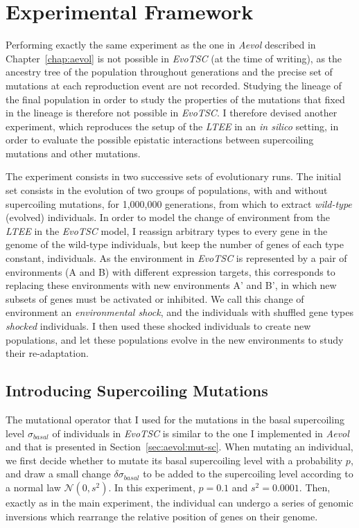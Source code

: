 \section{Experimental Framework}

Performing exactly the same experiment as the one in \emph{Aevol} described in Chapter~\ref{chap:aevol} is not possible in \emph{EvoTSC} (at the time of writing), as the ancestry tree of the population throughout generations and the precise set of mutations at each reproduction event are not recorded.
Studying the lineage of the final population in order to study the properties of the mutations that fixed in the lineage is therefore not possible in \emph{EvoTSC}.
I therefore devised another experiment, which reproduces the setup of the \emph{LTEE} in an \emph{in silico} setting, in order to evaluate the possible epistatic interactions between supercoiling mutations and other mutations.

The experiment consists in two successive sets of evolutionary runs.
The initial set consists in the evolution of two groups of populations, with and without supercoiling mutations, for 1,000,000 generations, from which to extract \emph{wild-type} (evolved) individuals.
In order to model the change of environment from the \emph{LTEE} in the \emph{EvoTSC} model, I reassign arbitrary types to every gene in the genome of the wild-type individuals, but keep the number of genes of each type constant, individuals.
As the environment in \emph{EvoTSC} is represented by a pair of environments (A and B) with different expression targets, this corresponds to replacing these environments with new environments A' and B', in which new subsets of genes must be activated or inhibited.
We call this change of environment an \emph{environmental shock}, and the individuals with shuffled gene types \emph{shocked} individuals.
I then used these shocked individuals to create new populations, and let these populations evolve in the new environments to study their re-adaptation.

\subsection{Introducing Supercoiling Mutations}

The mutational operator that I used for the mutations in the basal supercoiling level $\sigma_{basal}$ of individuals in \emph{EvoTSC} is similar to the one I implemented in \emph{Aevol} and that is presented in Section~\ref{sec:aevol:mut-sc}.
When mutating an individual, we first decide whether to mutate its basal supercoiling level with a probability $p$, and draw a small change $\delta\sigma_{basal}$ to be added to the supercoiling level according to a normal law $\mathcal{N}(0, s^2)$.
In this experiment, $p=0.1$ and $s^2=0.0001$.
Then, exactly as in the main experiment, the individual can undergo a series of genomic inversions which rearrange the relative position of genes on their genome.

